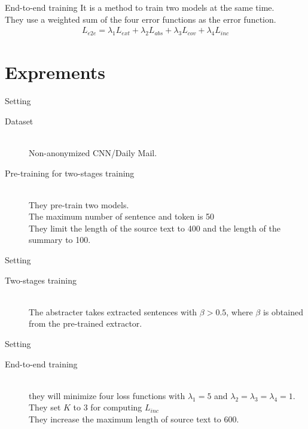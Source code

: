 \documentclass[17pt, unicode,dvipdfmx]{beamer}
\begin{document}
\begin{frame}{End-to-end training}
  It is a method to train two models at the same time.\\
  They use a weighted sum of the four error functions as the error function.
  \begin{align}
    L_{e2e}=\lambda_1 L_{ext}+\lambda_2 L_{abs}+\lambda_3 L_{cov} + \lambda_4 L_{inc}
  \end{align}
\end{frame}

\section{Exprements}
\begin{frame}{Setting}
    \begin{description}
      \item [Dataset]~\\ Non-anonymized CNN/Daily Mail.
      \item [Pre-training for two-stages training] ~\\They pre-train two models.\\The maximum number of sentence and
        token is 50\\
        They limit the length of the source text to 400 and the length of the summary to 100.
  \end{description}
\end{frame}


\begin{frame}{Setting}
    \begin{description}
      \item [Two-stages training]~\\ The abstracter takes extracted sentences with $\beta>0.5$, where $\beta$ is obtained from the pre-trained extractor.
    \end{description}
\end{frame}

\begin{frame}{Setting}
    \begin{description}
          \item [End-to-end training] ~\\ they will minimize four loss functions with
$\lambda_1 = 5$ and $\lambda_2 = \lambda_3 = \lambda_4 = 1$. \\
        They set $K$ to $3$ for computing $L_{inc}$\\
        They increase the maximum length of source text to $600$.\\
    \end{description}
\end{frame}
\end{document}
